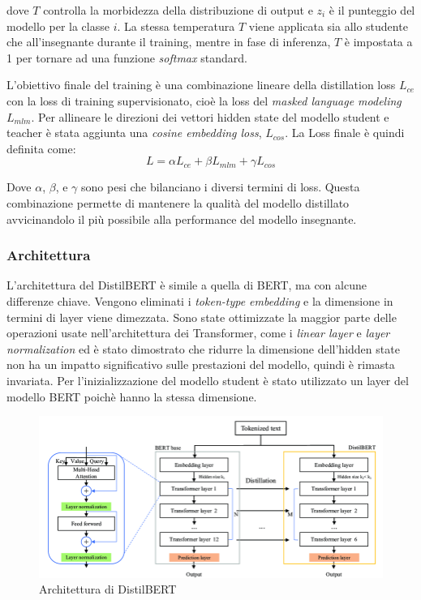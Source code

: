 \documentclass[../../Thesis.tex]{subfiles}
\begin{document}
dove $T$ controlla la morbidezza della distribuzione di output e $z_i$ è il punteggio del modello per la classe $i$. La stessa temperatura $T$ viene applicata sia allo studente che all'insegnante durante il training, mentre in fase di inferenza, $T$ è impostata a 1 per tornare ad una funzione \textit{softmax} standard.

L'obiettivo finale del training è una combinazione lineare della distillation loss $L_{ce}$ con la loss di  training supervisionato, cioè la loss del \textit{masked language modeling} $L_{mlm}$. Per allineare le direzioni dei vettori hidden state del modello student e teacher è stata aggiunta una  \textit{cosine embedding loss}, $L_{cos}$. La Loss finale è quindi definita come:
$$
L = \alpha L_{ce} + \beta L_{mlm} + \gamma L_{cos}
$$

Dove $\alpha$, $\beta$, e $\gamma$ sono pesi che bilanciano i diversi termini di loss. Questa combinazione permette di mantenere la qualità del modello distillato avvicinandolo il più possibile alla performance del modello insegnante.

\subsubsection{Architettura}
L'architettura del DistilBERT è simile a quella di BERT, ma con alcune differenze chiave. Vengono eliminati i \emph{token-type embedding} e la dimensione in termini di layer viene dimezzata. Sono state ottimizzate la maggior parte delle operazioni usate nell'architettura dei Transformer, come i \emph{linear layer} e \emph{layer normalization} ed è stato dimostrato che ridurre la dimensione dell'hidden state non ha un impatto significativo sulle prestazioni del modello, quindi è rimasta invariata. Per l'inizializzazione del modello student è stato utilizzato un layer del modello BERT poichè hanno la stessa dimensione. 

\begin{figure}
    \centering
    \includegraphics[width=\textwidth]{../../img/DistilBERT-Architecture.png}
    \caption{Architettura di DistilBERT}
    \label{fig:distilbert}
\end{figure}
\end{document}
